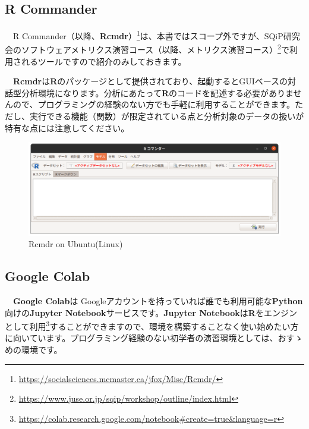 \documentclass[
  12pt,
]{book}
\DeclareRobustCommand{\href}[2]{#2\footnote{\url{#1}}}
\begin{document}
\hypertarget{r-commander}{%
\subsection{R Commander}\label{r-commander}}

　\href{https://socialsciences.mcmaster.ca/jfox/Misc/Rcmdr/}{R Commander（以降、\textbf{Rcmdr}）}は、本書ではスコープ外ですが、\href{https://www.juse.or.jp/sqip/workshop/outline/index.html}{SQiP研究会のソフトウェアメトリクス演習コース（以降、メトリクス演習コース）}で利用されるツールですので紹介のみしておきます。

　\textbf{Rcmdr}は\textbf{R}のパッケージとして提供されており、起動するとGUIベースの対話型分析環境になります。分析にあたって\textbf{R}のコードを記述する必要がありませんので、プログラミングの経験のない方でも手軽に利用することができます。ただし、実行できる機能（関数）が限定されている点と分析対象のデータの扱いが特有な点には注意してください。

\begin{figure}[H]

{\centering \includegraphics[width=0.9\linewidth,]{./fig/RCmdr} 

}

\caption{Rcmdr on Ubuntu(Linux)}\label{fig:unnamed-chunk-14}
\end{figure}

\hypertarget{google-colab}{%
\subsection{Google Colab}\label{google-colab}}

　\textbf{Google Colab}は Googleアカウントを持っていれば誰でも利用可能な\textbf{Python}向けの\textbf{Jupyter Notebook}サービスです。\href{https://colab.research.google.com/notebook\#create=true\&language=r}{\textbf{Jupyter Notebook}は\textbf{R}をエンジンとして利用}することができますので、環境を構築することなく使い始めたい方に向いています。プログラミング経験のない初学者の演習環境としては、おすゝめの環境です。
\end{document}
